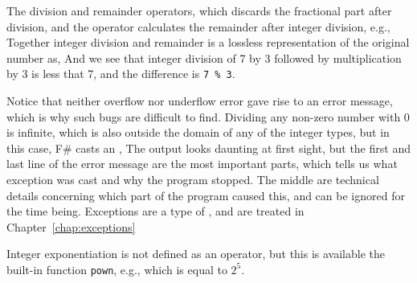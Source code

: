 The division and remainder operators, which discards the fractional part after division, and the  operator calculates the remainder after integer division, e.g.,
%
%
Together integer division and remainder is a lossless representation of the original number as,
%
%
And we see that integer division of 7 by 3 followed by multiplication by 3 is less that 7, and the difference is \lstinline!7 % 3!.

Notice that neither overflow nor underflow error gave rise to an error message, which is why such bugs are difficult to find. 
 Dividing any non-zero number with 0 is infinite, which is also outside the domain of any of the integer types, but in this case, F\# casts an ,
%
%
The output looks daunting at first sight, but the first and last line of the error message are the most important parts, which tells us what exception was cast and why the program stopped. The middle are technical details concerning which part of the program caused this, and can be ignored for the time being. Exceptions are a type of , and are treated in Chapter~\ref{chap:exceptions}

Integer exponentiation is not defined as an operator, but this is available the built-in function \lstinline|pown|, e.g.,
%
%
which is equal to $2^5$.


